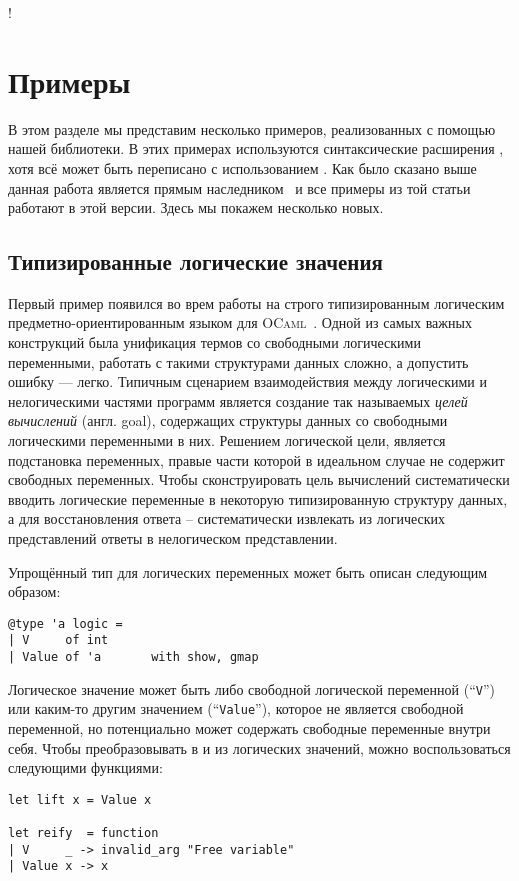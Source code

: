 !\section{Примеры}
\label{sec:examples}

В этом разделе мы представим несколько примеров, реализованных с помощью нашей библиотеки. В этих примерах используются синтаксические расширения , хотя всё может быть переписано с использованием . Как было сказано выше данная работа является прямым наследником~\cite{TransformationObjects} и все примеры из той статьи работают в этой версии. Здесь мы покажем несколько новых.

\subsection{Типизированные логические значения}

Первый пример появился во врем работы на строго типизированным логическим предметно-ориентированным языком для \textsc{OCaml}~\cite{OCanren}. 
Одной из самых важных конструкций была унификация термов со свободными логическими переменными, работать с такими структурами данных сложно, а допустить ошибку --- легко. Типичным сценарием взаимодействия  между логическими и нелогическими частями программ является 
создание так называемых \emph{целей вычислений} (англ. goal), содержащих структуры данных со свободными логическими переменными в них.
Решением логической цели, является подстановка переменных, правые части которой в идеальном случае не содержит свободных переменных. Чтобы
сконструировать цель вычислений систематически вводить логические переменные в некоторую типизированную структуру данных,  а для восстановления ответа -- систематически извлекать из логических представлений ответы в нелогическом представлении.

Упрощённый тип для логических переменных может быть описан следующим образом:

\begin{lstlisting}
@type 'a logic =
| V     of int
| Value of 'a       with show, gmap
\end{lstlisting}
Логическое значение может быть либо свободной логической переменной (``\lstinline{V}'') или каким-то другим значением (``\lstinline{Value}''), которое не является свободной переменной, но потенциально может содержать свободные переменные внутри себя. Чтобы преобразовывать в и из логических значений, можно воспользоваться следующими функциями:

\begin{lstlisting}
let lift x = Value x

let reify  = function
| V     _ -> invalid_arg "Free variable"
| Value x -> x
\end{lstlisting}

